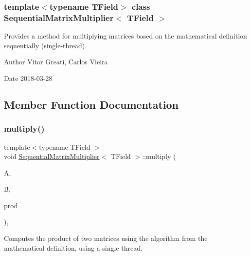 \subsubsection*{template$<$typename T\+Field$>$\newline
class Sequential\+Matrix\+Multiplier$<$ T\+Field $>$}

Provides a method for multiplying matrices based on the mathematical definition sequentially (single-\/thread). 

\begin{DoxyAuthor}{Author}
Vitor Greati, Carlos Vieira 
\end{DoxyAuthor}
\begin{DoxyDate}{Date}
2018-\/03-\/28 
\end{DoxyDate}


\subsection{Member Function Documentation}
\mbox{\label{classSequentialMatrixMultiplier_aeb79c1b8b364bfb810f20b6e2b192a1b}} 
\subsubsection{\texorpdfstring{multiply()}{multiply()}}
{\footnotesize\ttfamily template$<$typename T\+Field $>$ \\
void \mbox{\hyperlink{classSequentialMatrixMultiplier}{Sequential\+Matrix\+Multiplier}}$<$ T\+Field $>$\+::multiply (\begin{DoxyParamCaption}\item[{const \mbox{\hyperlink{classMatrix}{Matrix}}$<$ T\+Field $>$ \&}]{A,  }\item[{const \mbox{\hyperlink{classMatrix}{Matrix}}$<$ T\+Field $>$ \&}]{B,  }\item[{\mbox{\hyperlink{classMatrix}{Matrix}}$<$ T\+Field $>$ \&}]{prod }\end{DoxyParamCaption})\hspace{0.3cm}{\ttfamily [inline]}, {\ttfamily [virtual]}}



Computes the product of two matrices using the algorithm from the mathematical definition, using a single thread. 



